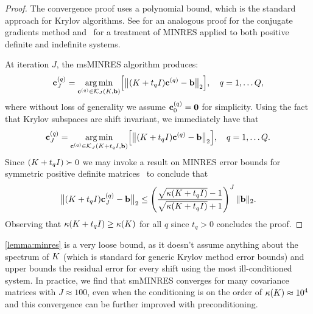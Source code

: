 \begin{proof}
  The convergence proof uses a polynomial bound, which is the standard approach for Krylov algorithms.
  See \citep[e.g.][]{shewchuk1994introduction,trefethen1997numerical,saad2003iterative} for an analogous proof for the conjugate gradients method and~\citep[e.g.][]{greenbaum1997iterative} for a treatment of MINRES applied to both positive definite and indefinite systems.

	At iteration $J$, the msMINRES algorithm produces:
	\begin{align}
    \mathbf{c}^{(q)}_J
    = \operatorname*{arg\,min}_{\mathbf{c}^{(q)} \in \mathcal{K}_J(K, \mathbf{b})} \Bigl[
      \bigl\Vert (K + t_q I) \mathbf{c}^{(q)} - \mathbf{b} \bigr\Vert_2
    \Bigr],
    \quad
    q = 1, \ldots Q,
    \label{eqn:minres_krylov}
	\end{align}
  where without loss of generality we assume $\mathbf{c}_0^{(q)} = \mathbf{0}$ for simplicity.
  Using the fact that Krylov subspaces are shift invariant, we immediately have that
  \begin{align}
    \mathbf{c}^{(q)}_J
    = \operatorname*{arg\,min}_{\mathbf{c}^{(q)} \in \mathcal{K}_J(K+t_q I, \mathbf{b})} \Bigl[
      \bigl\Vert (K + t_q I) \mathbf{c}^{(q)} - \mathbf{b} \bigr\Vert_2
    \Bigr],
    \quad
    q = 1, \ldots Q.
    \label{eqn:minres_krylov}
  \end{align}
  Since $(K + t_q I)\succ 0$ we may invoke a result on MINRES error bounds for symmetric positive definite matrices~\citep[Chapter 3]{greenbaum1997iterative} to conclude that
  \[
    \bigl\Vert (K + t_q I) \mathbf{c}_J^{(q)} - \mathbf{b} \bigr\Vert_2
    \leq \left( \frac{
      \sqrt{\kappa(K + t_q I)} - 1
    }{
      \sqrt{\kappa(K + t_q I)} + 1
    }\right)^J
    \Vert \mathbf{b} \Vert_2.
  \]
  Observing that $\kappa(K + t_q I) \geq \kappa(K)$ for all $q$ since $t_q > 0$ concludes the proof.
\end{proof}
%
\noindent
\cref{lemma:minres} is a very loose bound, as it doesn't assume anything about the spectrum of $K$ (which is standard for generic Krylov method error bounds) and upper bounds the residual error for every shift using the most ill-conditioned system.
In practice, we find that smMINRES converges for many covariance matrices with $J \approx 100$, even when the conditioning is on the order of $\kappa(K) \approx 10^4$ and this convergence can be further improved with preconditioning.


